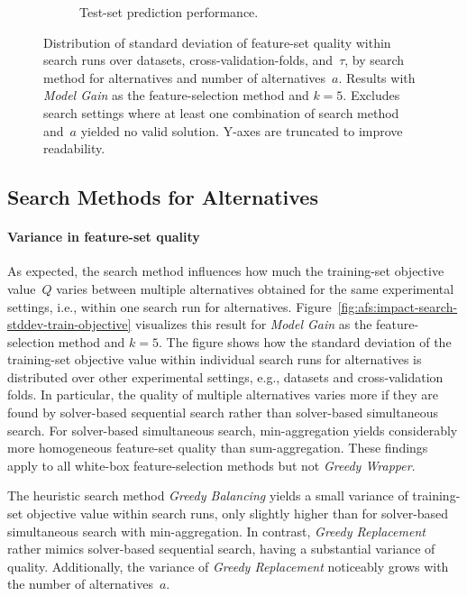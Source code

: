 \documentclass{article}
\theoremstyle{definition}
\begin{document}
\begin{figure}[p]
\begin{subfigure}[t]{\textwidth}
		\caption{Test-set prediction performance.}
		\label{fig:afs:impact-search-stddev-decision-tree-test-mcc}
	\end{subfigure}
	\caption{
		Distribution of standard deviation of feature-set quality within search runs over datasets, cross-validation-folds, and~$\tau$, by search method for alternatives and number of alternatives~$a$.
		Results with \emph{Model Gain} as the feature-selection method and $k=5$.
		Excludes search settings where at least one combination of search method and~$a$ yielded no valid solution.
		Y-axes are truncated to improve readability.
	}
	\label{fig:afs:impact-search-stddev-quality}
\end{figure}

\subsection{Search Methods for Alternatives}
\label{sec:afs:evaluation:search-methods}

\paragraph{Variance in feature-set quality}

As expected, the search method influences how much the training-set objective value~$Q$ varies between multiple alternatives obtained for the same experimental settings, i.e., within one search run for alternatives.
Figure~\ref{fig:afs:impact-search-stddev-train-objective} visualizes this result for \emph{Model Gain} as the feature-selection method and $k=5$.
The figure shows how the standard deviation of the training-set objective value within individual search runs for alternatives is distributed over other experimental settings, e.g., datasets and cross-validation folds.
In particular, the quality of multiple alternatives varies more if they are found by solver-based sequential search rather than solver-based simultaneous search.
For solver-based simultaneous search, min-aggregation yields considerably more homogeneous feature-set quality than sum-aggregation.
These findings apply to all white-box feature-selection methods but not \emph{Greedy Wrapper}.

The heuristic search method \emph{Greedy Balancing} yields a small variance of training-set objective value within search runs, only slightly higher than for solver-based simultaneous search with min-aggregation.
In contrast, \emph{Greedy Replacement} rather mimics solver-based sequential search, having a substantial variance of quality.
Additionally, the variance of \emph{Greedy Replacement} noticeably grows with the number of alternatives~$a$.
\end{document}
